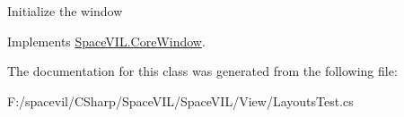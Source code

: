 Initialize the window 



Implements \mbox{\hyperlink{class_space_v_i_l_1_1_core_window_aa3cf4ac54d9651b1149584dc81042824}{Space\+V\+I\+L.\+Core\+Window}}.



The documentation for this class was generated from the following file\+:\begin{DoxyCompactItemize}
\item 
F\+:/spacevil/\+C\+Sharp/\+Space\+V\+I\+L/\+Space\+V\+I\+L/\+View/Layouts\+Test.\+cs\end{DoxyCompactItemize}
